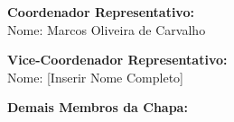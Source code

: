 \documentclass[11pt,a4paper]{article}
\begin{document}
\vspace{2cm}

\noindent\textbf{Coordenador Representativo:} \\
Nome: Marcos Oliveira de Carvalho \\


\vspace{1.5cm}

\noindent\textbf{Vice-Coordenador Representativo:} \\
Nome: [Inserir Nome Completo] \\


\vspace{2cm}

\noindent\textbf{Demais Membros da Chapa:} \\{}
\end{document}
